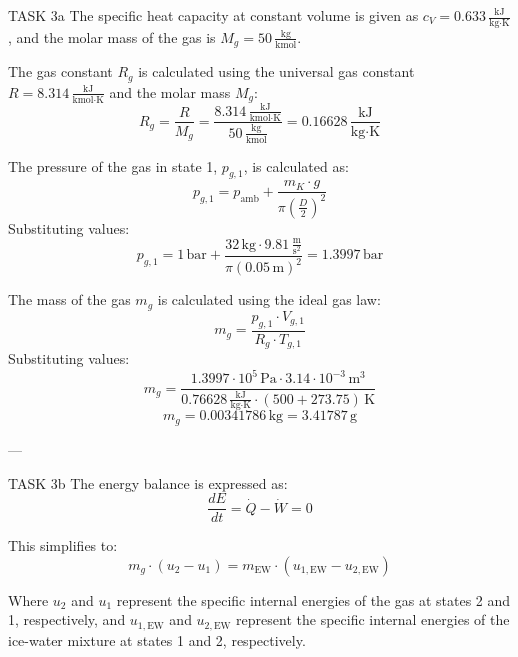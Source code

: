TASK 3a  
The specific heat capacity at constant volume is given as \( c_V = 0.633 \, \frac{\text{kJ}}{\text{kg·K}} \), and the molar mass of the gas is \( M_g = 50 \, \frac{\text{kg}}{\text{kmol}} \).  

The gas constant \( R_g \) is calculated using the universal gas constant \( R = 8.314 \, \frac{\text{kJ}}{\text{kmol·K}} \) and the molar mass \( M_g \):  
\[
R_g = \frac{R}{M_g} = \frac{8.314 \, \frac{\text{kJ}}{\text{kmol·K}}}{50 \, \frac{\text{kg}}{\text{kmol}}} = 0.16628 \, \frac{\text{kJ}}{\text{kg·K}}
\]  

The pressure of the gas in state 1, \( p_{g,1} \), is calculated as:  
\[
p_{g,1} = p_{\text{amb}} + \frac{m_K \cdot g}{\pi \left( \frac{D}{2} \right)^2}
\]  
Substituting values:  
\[
p_{g,1} = 1 \, \text{bar} + \frac{32 \, \text{kg} \cdot 9.81 \, \frac{\text{m}}{\text{s}^2}}{\pi \left( 0.05 \, \text{m} \right)^2} = 1.3997 \, \text{bar}
\]  

The mass of the gas \( m_g \) is calculated using the ideal gas law:  
\[
m_g = \frac{p_{g,1} \cdot V_{g,1}}{R_g \cdot T_{g,1}}
\]  
Substituting values:  
\[
m_g = \frac{1.3997 \cdot 10^5 \, \text{Pa} \cdot 3.14 \cdot 10^{-3} \, \text{m}^3}{0.76628 \, \frac{\text{kJ}}{\text{kg·K}} \cdot (500 + 273.75) \, \text{K}}
\]  
\[
m_g = 0.00341786 \, \text{kg} = 3.41787 \, \text{g}
\]  

---

TASK 3b  
The energy balance is expressed as:  
\[
\frac{dE}{dt} = \dot{Q} - \dot{W} = 0
\]  

This simplifies to:  
\[
m_g \cdot (u_2 - u_1) = m_{\text{EW}} \cdot (u_{1,\text{EW}} - u_{2,\text{EW}})
\]  

Where \( u_2 \) and \( u_1 \) represent the specific internal energies of the gas at states 2 and 1, respectively, and \( u_{1,\text{EW}} \) and \( u_{2,\text{EW}} \) represent the specific internal energies of the ice-water mixture at states 1 and 2, respectively.